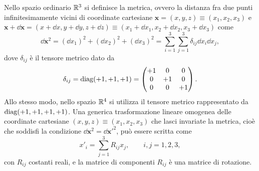 Nello spazio ordinario $\mathbb{R}^{3}$ si definisce la metrica, ovvero la distanza fra
due punti infinitesimamente vicini di coordinate cartesiane
$\bm{x} = (x,y,z) \equiv (x_{1},x_{2},x_{3})$ e
$\bm{x} + \dd \bm{x} = (x+\dd x,y+\dd y,z+\dd z) \equiv (x_{1}+\dd
x_{1},x_{2}+\dd x_{2},x_{3}+\dd x_{3})$ come
\begin{equation}
  \dd\bm{x}^{2} = (\dd x_{1})^{2} + (\dd x_{2})^{2} + (\dd x_{3})^{2} =
  \sum_{i=1}^{3} \sum_{j=1}^{3} \delta_{ij} \dd x_{i} \dd x_{j},
\end{equation}
dove $\delta_{ij}$ è il tensore metrico dato da
\begin{equation}
  \delta_{ij} = \operatorname{diag} (+1,+1,+1) =
  \begin{pmatrix}
    +1 & 0  & 0  \\
    0  & +1 & 0  \\
    0  & 0  & +1
  \end{pmatrix}.
\end{equation}
Allo stesso modo, nello spazio $\mathbb{R}^{4}$ si utilizza il tensore metrico
rappresentato da $\operatorname{diag} (+1,+1,+1,+1)$.  Una generica trasformazione lineare
omogenea delle coordinate cartesiane $(x,y,z) \equiv (x_{1},x_{2},x_{3})$ che
lasci invariate la metrica, cioè che soddisfi la condizione
$\dd\bm{x}^{2} = \dd\bm{x}'^{2}$, può essere scritta come
\begin{equation}
  x'_{i} = \sum_{j=1}^{3} R_{ij}x_{j}, \qquad i,j = 1,2,3,
\end{equation}
con $R_{ij}$ costanti reali, e la matrice di componenti $R_{ij}$ è una matrice
di rotazione.

